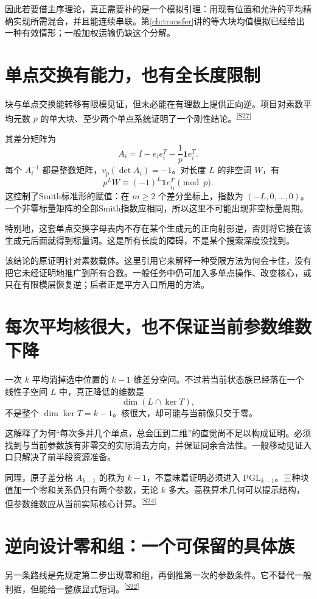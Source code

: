 \documentclass[11pt,a4paper,oneside,openany]{book}
\newcommand{\src}[1]{\textsuperscript{\hyperref[source:#1]{[#1]}}}
\theoremstyle{definition}\newtheorem{example}[theorem]{例}\newtheorem{conjecture}[theorem]{猜想}
\numberwithin{equation}{chapter}\setcounter{tocdepth}{1}
\begin{document}
因此若要借主序理论，真正需要补的是一个模拟引理：用现有位置和允许的平均精确实现所需混合，并且能连续串联。第\ref{ch:transfer}讲的等大块均值模拟已经给出一种有效情形；一般加权运输仍缺这个分解。

\section{单点交换有能力，也有全长度限制}
块与单点交换能转移有限模见证，但未必能在有理数上提供正向逆。项目对素数平均元数 $p$ 的单大块、至少两个单点系统证明了一个刚性结论。\src{S27}

其差分矩阵为
\[A_i=I-e_ie_i^T-\frac1p\mathbf1e_i^T.
\]
每个 $A_i^{-1}$ 都是整数矩阵，$v_p(\det A_i)=-1$。对长度 $L$ 的非空词 $W$，有
\[p^LW\equiv(-1)^L\mathbf1e_{i_1}^T\pmod p.
\]
这控制了Smith标准形的赋值：在 $m\ge2$ 个差分坐标上，指数为 $(-L,0,\ldots,0)$。一个非零标量矩阵的全部Smith指数应相同，所以这里不可能出现非空标量周期。

特别地，这套单点交换字母表内不存在某个生成元的正向射影逆，否则将它接在该生成元后面就得到标量词。这是所有长度的障碍，不是某个搜索深度没找到。

该结论的原证明针对素数载体。这里引用它来解释一种受限方法为何会卡住，没有把它未经证明地推广到所有合数。一般任务中仍可加入多单点操作、改变核心，或只在有限模层恢复逆；后者正是平方入口所用的方法。

\section{每次平均核很大，也不保证当前参数维数下降}
一次 $k$ 平均消掉选中位置的 $k-1$ 维差分空间。不过若当前状态族已经落在一个线性子空间 $L$ 中，真正降低的维数是
\[\dim(L\cap\ker T),
\]
不是整个 $\dim\ker T=k-1$。核很大，却可能与当前像只交于零。

这解释了为何“每次多并几个单点，总会压到二维”的直觉尚不足以构成证明。必须找到与当前参数族有非零交的实际消去方向，并保证同余合法性。一般移动见证入口只解决了前半段资源准备。

同理，原子差分格 $A_{k-1}$ 的秩为 $k-1$，不意味着证明必须进入 $\mathrm{PGL}_{k-1}$。三种块值加一个零和关系仍只有两个参数，无论 $k$ 多大。高秩算术几何可以提示结构，但参数维数应从当前实际核心计算。\src{S24}

\section{逆向设计零和组：一个可保留的具体族}
另一条路线是先规定第二步出现零和组，再倒推第一次的参数条件。它不替代一般判据，但能给一整族显式短词。\src{S22}
\end{document}
